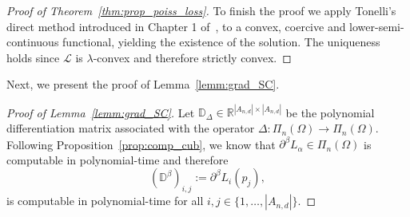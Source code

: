 \documentclass[pdflatex]{sn-jnl}%
\begin{document}
\begin{proof}[Proof of Theorem~\ref{thm:prop_poiss_loss}]
To finish the proof we apply Tonelli's direct method introduced in Chapter 1 of~\cite{Maso1993}, to a convex, coercive and lower-semi-continuous functional, yielding the existence of the solution. The uniqueness holds since $\mathcal{L}$ is $\lambda$-convex and therefore strictly convex.  
\end{proof}
Next, we present the proof of Lemma~\ref{lemm:grad_SC}.
\begin{proof}[Proof of Lemma~\ref{lemm:grad_SC}]
Let $\mathbb{D}_{\Delta}\in \mathbb{R}^{|A_{n,d}|\times |A_{n,d}|}$ be the polynomial differentiation matrix associated with the operator $\Delta:\Pi_{n}(\Omega)\rightarrow\Pi_{n}(\Omega)$. Following Proposition~\ref{prop:comp_cub}, we know that $\partial^\beta L_{\alpha}\in \Pi_{n}(\Omega)$ is computable in polynomial-time and therefore 
\begin{equation}
    (\mathbb{D}^\beta)_{i,j}:= \partial^\beta L_{i}(p_j),
\end{equation}
is computable in polynomial-time for all $i,j\in \{1,\dots, |A_{n,d}|\}$.


\end{proof}
\end{document}
